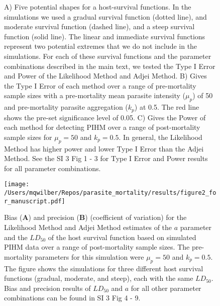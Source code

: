\documentclass[12pt, a4paper]{article}
\begin{document}
\begin{figure}


\caption{A) Five potential shapes for a host-survival functions. In the simulations we used a gradual survival function (dotted line), and moderate survival function (dashed line), and a steep survival function (solid line). The linear and immediate survival functions represent two potential extremes that we do not include in the simulations. For each of these survival functions and the parameter combinations described in the main text, we tested the Type I Error and Power of the Likelihood Method and Adjei Method. B) Gives the Type I Error of each method over a range of pre-mortality sample sizes with a pre-mortality mean parasite intensity ($\mu_p$) of 50 and pre-mortality parasite aggregation ($k_p$) at 0.5. The red line shows the pre-set significance level of 0.05. C) Gives the Power of each method for detecting PIHM over a range of post-mortality sample sizes for $\mu_p = 50$ and $k_p = 0.5$.  In general, the Likelihood Method has higher power and lower Type I Error than the Adjei Method.  See the SI 3 Fig 1 - 3 for Type I Error and Power results for all parameter combinations.}

\end{figure}

\begin{figure}
    \texttt{[image: /Users/mqwilber/Repos/parasite\_mortality/results/figure2\_for\_manuscript.pdf]}

    \caption{Bias (\textbf{A}) and precision (\textbf{B}) (coefficient of variation) for the Likelihood Method and Adjei Method estimates of the $a$ parameter and the $LD_{50}$ of the host survival function based on simulated PIHM data over a range of post-mortality sample sizes. The pre-mortality parameters for this simulation were $\mu_p = 50$ and $k_p = 0.5$.  The figure shows the simulations for three different host survival functions (gradual, moderate, and steep), each with the same $LD_{50}$.  Bias and precision results of $LD_{50}$ and $a$ for all other parameter combinations can be found in SI 3 Fig 4 - 9.}

    \label{fig:question2}

\end{figure}
\end{document}
